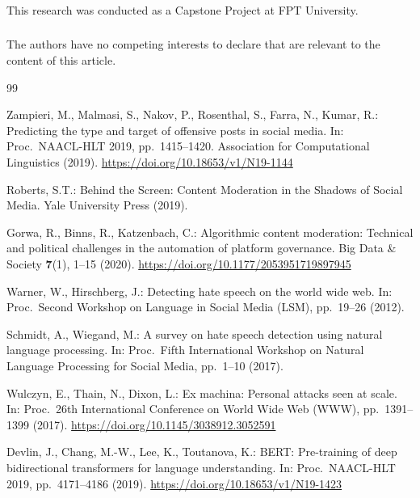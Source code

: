 \documentclass[runningheads]{llncs}
\providecommand{\doi}[1]{\url{https://doi.org/#1}}
\begin{document}
\begin{credits}
\subsubsection{\ackname}
This research was conducted as a Capstone Project at FPT University.

\subsubsection{\discintname}
The authors have no competing interests to declare that are relevant to the content of this article.
\end{credits}
%
%
\begin{thebibliography}{99}

Zampieri, M., Malmasi, S., Nakov, P., Rosenthal, S., Farra, N., Kumar, R.: Predicting the type and target of offensive posts in social media. In: Proc.\ NAACL-HLT 2019, pp.~1415--1420. Association for Computational Linguistics (2019). \doi{10.18653/v1/N19-1144}

Roberts, S.T.: Behind the Screen: Content Moderation in the Shadows of Social Media. Yale University Press (2019).

Gorwa, R., Binns, R., Katzenbach, C.: Algorithmic content moderation: Technical and political challenges in the automation of platform governance. Big Data \& Society \textbf{7}(1), 1--15 (2020).
\doi{10.1177/2053951719897945}

Warner, W., Hirschberg, J.: Detecting hate speech on the world wide web. In: Proc.\ Second Workshop on Language in Social Media (LSM), pp.~19--26 (2012).

Schmidt, A., Wiegand, M.: A survey on hate speech detection using natural language processing. In: Proc.\ Fifth International Workshop on Natural Language Processing for Social Media, pp.~1--10 (2017).

Wulczyn, E., Thain, N., Dixon, L.: Ex machina: Personal attacks seen at scale. In: Proc.\ 26th International Conference on World Wide Web (WWW), pp.~1391--1399 (2017).
\doi{10.1145/3038912.3052591}

Devlin, J., Chang, M.-W., Lee, K., Toutanova, K.: BERT: Pre-training of deep bidirectional transformers for language understanding. In: Proc.\ NAACL-HLT 2019, pp.~4171--4186 (2019).
\doi{10.18653/v1/N19-1423}


\end{thebibliography}
\end{document}
